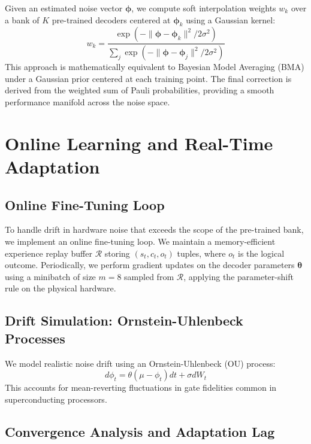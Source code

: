 \documentclass[journal,twocolumn]{IEEEtran}
\begin{document}
Given an estimated noise vector $\boldsymbol{\phi}$, we compute soft interpolation weights $w_k$ over a bank of $K$ pre-trained decoders centered at $\boldsymbol{\phi}_k$ using a Gaussian kernel:
\begin{equation}
    w_k = \frac{\exp(-\|\boldsymbol{\phi} - \boldsymbol{\phi}_k\|^2 / 2\sigma^2)}{\sum_j \exp(-\|\boldsymbol{\phi} - \boldsymbol{\phi}_j\|^2 / 2\sigma^2)}
\end{equation}
This approach is mathematically equivalent to Bayesian Model Averaging (BMA) under a Gaussian prior centered at each training point. The final correction is derived from the weighted sum of Pauli probabilities, providing a smooth performance manifold across the noise space.

\section{Online Learning and Real-Time Adaptation}

\subsection{Online Fine-Tuning Loop}

To handle drift in hardware noise that exceeds the scope of the pre-trained bank, we implement an online fine-tuning loop. We maintain a memory-efficient experience replay buffer $\mathcal{R}$ storing $(s_t, c_t, o_t)$ tuples, where $o_t$ is the logical outcome. Periodically, we perform gradient updates on the decoder parameters $\boldsymbol{\theta}$ using a minibatch of size $m=8$ sampled from $\mathcal{R}$, applying the parameter-shift rule on the physical hardware.

\subsection{Drift Simulation: Ornstein-Uhlenbeck Processes}

We model realistic noise drift using an Ornstein-Uhlenbeck (OU) process:
\begin{equation}
    d\phi_t = \theta(\mu - \phi_t)dt + \sigma dW_t
\end{equation}
This accounts for mean-reverting fluctuations in gate fidelities common in superconducting processors.

\subsection{Convergence Analysis and Adaptation Lag}
\end{document}
